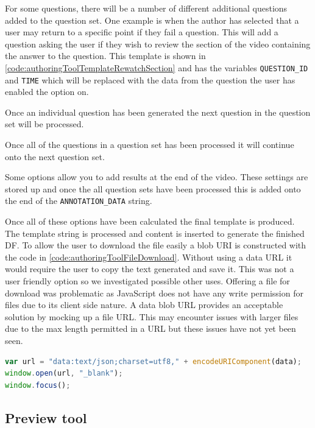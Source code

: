 For some questions, there will be a number of different additional questions added to the question set. One example is when the author has selected that a user may return to a specific point if they fail a question. This will add a question asking the user if they wish to review the section of the video containing the answer to the question. This template is shown in \autoref{code:authoringToolTemplateRewatchSection} and has the variables \lstinline|QUESTION_ID| and \lstinline|TIME| which will be replaced with the data from the question the user has enabled the option on.

Once an individual question has been generated the next question in the question set will be processed.

Once all of the questions in a question set has been processed it will continue onto the next question set.

Some options allow you to add results at the end of the video. These settings are stored up and once the all question sets have been processed this is added onto the end of the \lstinline|ANNOTATION_DATA| string.

Once all of these options have been calculated the final template is produced. The template string is processed and content is inserted to generate the finished \gls{DF}. To allow the user to download the file easily a \gls{blob} URI is constructed with the code in \autoref{code:authoringToolFileDownload}. Without using a data URL it would require the user to copy the text generated and save it. This was not a user friendly option so we investigated possible other uses. Offering a file for download was problematic as JavaScript does not have any write permission for files due to its client side nature. A data \gls{blob} URL provides an acceptable solution by mocking up a file URL. This may encounter issues with larger files due to the max length permitted in a URL but these issues have not yet been seen.

\begin{lstlisting}[language=javascript,caption={The final \gls{DF} is offered for downloading using a data \gls{blob} URL},label={code:authoringToolFileDownload} ]
var url = "data:text/json;charset=utf8," + encodeURIComponent(data);
window.open(url, "_blank");
window.focus();
\end{lstlisting}

\subsection{Preview tool}

